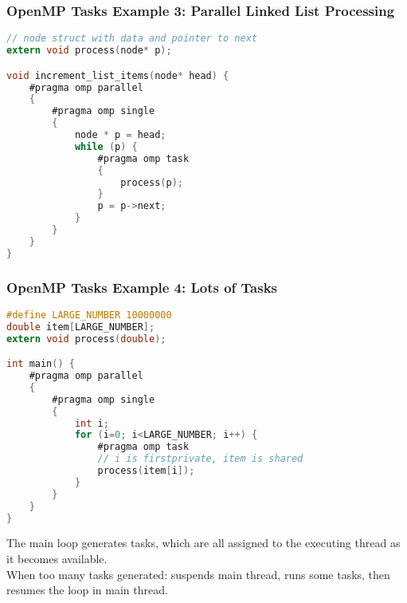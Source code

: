 \begin{frame}[fragile]
  \frametitle{OpenMP Tasks Example 3: Parallel Linked List Processing}

\begin{changemargin}{2cm}
  \begin{lstlisting}[language=C,morekeywords={foreach,pragma,omp,parallel,single,nowait,task,untied,barrier,taskyield,mergeable,final,taskwait,critical}]
// node struct with data and pointer to next
extern void process(node* p);

void increment_list_items(node* head) {
    #pragma omp parallel
    {
        #pragma omp single
        {
            node * p = head;
            while (p) {
                #pragma omp task
                {
                    process(p);
                }
                p = p->next;
            }
        }
    }
}
  \end{lstlisting}
\end{changemargin}

\end{frame}


\begin{frame}[fragile]
  \frametitle{OpenMP Tasks Example 4: Lots of Tasks}

  \begin{changemargin}{2cm}
  \begin{lstlisting}[language=C,morekeywords={foreach,pragma,omp,parallel,single,nowait,task,untied,barrier,taskyield,mergeable,final,taskwait,critical}]
#define LARGE_NUMBER 10000000
double item[LARGE_NUMBER];
extern void process(double);

int main() {
    #pragma omp parallel
    {
        #pragma omp single
        {
            int i;
            for (i=0; i<LARGE_NUMBER; i++) {
                #pragma omp task
                // i is firstprivate, item is shared
                process(item[i]);
            }
        }
    }
}
  \end{lstlisting}

  The main loop generates tasks, which are all assigned to the executing thread as it becomes available.\\[1em]
  When too many tasks generated: suspends main thread, runs some tasks, then resumes the loop in main thread.
  \end{changemargin}
  
\end{frame}

